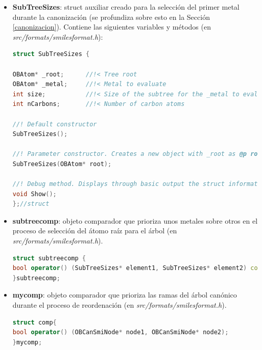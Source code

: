 \begin{itemize}
\begin{lstlisting}[language=C++]
//! \return If @p bond is likely to be a cp-bond like
bool isCpBond(OBBond* bond, unsigned int idxM);

//! Finds the ring of which the carbon with idx @p carbonIdx is a part of, among the rings of @p rlist (obtained from a SSSR perspective), and stores it in @p result.
//! \returns whether it was found or not
bool FindRingWithCarbon(vector<OBRing*>& rlist, int carbonIdx, OBRing*& result);

//! Canonize the input SMILES and identify blocks
void CanonizeOgm(OBMol* mol, OBConversion* pConv); 
}; //class
    \end{lstlisting}


    
    \item \textbf{SubTreeSizes}: struct auxiliar creado para la selección del primer metal durante la canonización (se profundiza sobre esto en la Sección \ref{canonizacion}). Contiene las siguientes variables y métodos (en \textit{src/formats/smilesformat.h}):
    \begin{lstlisting}[language=C++]
struct SubTreeSizes {

OBAtom* _root;      //!< Tree root
OBAtom* _metal;     //!< Metal to evaluate
int size;           //!< Size of the subtree for the _metal to evaluate
int nCarbons;       //!< Number of carbon atoms

//! Default constructor
SubTreeSizes();

//! Parameter constructor. Creates a new object with _root as @p root
SubTreeSizes(OBAtom* root);

//! Debug method. Displays through basic output the struct information.
void Show();
};//struct
    \end{lstlisting}


    \item \textbf{subtreecomp}: objeto comparador que prioriza unos metales sobre otros en el proceso de selección del átomo raíz para el árbol (en \textit{src/formats/smilesformat.h}).
    \begin{lstlisting}[language=C++]
struct subtreecomp {
bool operator() (SubTreeSizes* element1, SubTreeSizes* element2) const;
}subtreecomp;
    \end{lstlisting}


    \item \textbf{mycomp}: objeto comparador que prioriza las ramas del árbol canónico durante el proceso de reordenación (en \textit{src/formats/smilesformat.h}).
    \begin{lstlisting}[language=C++]
struct comp{
bool operator() (OBCanSmiNode* node1, OBCanSmiNode* node2);
}mycomp;
    \end{lstlisting}
    
\end{itemize}


